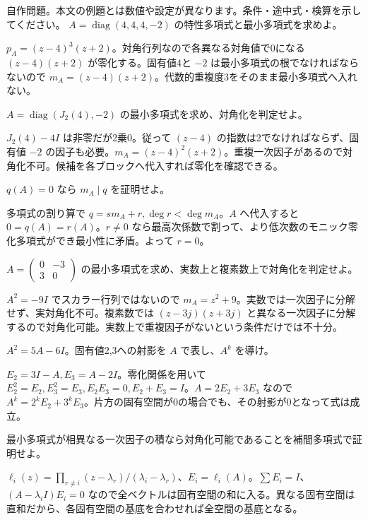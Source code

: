 \documentclass[11pt]{article}
\begin{document}
自作問題。本文の例題とは数値や設定が異なります。条件・途中式・検算を示してください。
\problem[最小と特性の違い]
$A=\operatorname{diag}(4,4,4,-2)$ の特性多項式と最小多項式を求めよ。
\begin{ans}
$p_A=(z-4)^3(z+2)$。対角行列なので各異なる対角値で0になる $(z-4)(z+2)$ が零化する。固有値4と $-2$ は最小多項式の根でなければならないので $m_A=(z-4)(z+2)$。代数的重複度3をそのまま最小多項式へ入れない。
\end{ans}
\problem[非自明なブロック]
$A=\operatorname{diag}(J_2(4),-2)$ の最小多項式を求め、対角化を判定せよ。
\begin{ans}
$J_2(4)-4I$ は非零だが2乗0。従って $(z-4)$ の指数は2でなければならず、固有値 $-2$ の因子も必要。$m_A=(z-4)^2(z+2)$。重複一次因子があるので対角化不可。候補を各ブロックへ代入すれば零化を確認できる。
\end{ans}
\newpage
\problem[整除性の証明]
$q(A)=0$ なら $m_A\mid q$ を証明せよ。
\begin{ans}
多項式の割り算で $q=s m_A+r,\deg r<\deg m_A$。$A$ へ代入すると $0=q(A)=r(A)$。$r\ne0$ なら最高次係数で割って、より低次数のモニック零化多項式ができ最小性に矛盾。よって $r=0$。
\end{ans}
\problem[体の条件]
$A=\begin{pmatrix}0&-3\\3&0\end{pmatrix}$ の最小多項式を求め、実数上と複素数上で対角化を判定せよ。
\begin{ans}
$A^2=-9I$ でスカラー行列ではないので $m_A=z^2+9$。実数では一次因子に分解せず、実対角化不可。複素数では $(z-3j)(z+3j)$ と異なる一次因子に分解するので対角化可能。実数上で重複因子がないという条件だけでは不十分。
\end{ans}
\newpage
\problem[スペクトル射影]
$A^2=5A-6I$。固有値2,3への射影を $A$ で表し、$A^k$ を導け。
\begin{ans}
$E_2=3I-A,E_3=A-2I$。零化関係を用いて $E_2^2=E_2,E_3^2=E_3,E_2E_3=0,E_2+E_3=I$。$A=2E_2+3E_3$ なので $A^k=2^kE_2+3^kE_3$。片方の固有空間が0の場合でも、その射影が0となって式は成立。
\end{ans}
\problem[十分性の証明]
最小多項式が相異なる一次因子の積なら対角化可能であることを補間多項式で証明せよ。
\begin{ans}
$\ell_i(z)=\prod_{r\ne i}(z-\lambda_r)/(\lambda_i-\lambda_r)$、$E_i=\ell_i(A)$。$\sum E_i=I$、$(A-\lambda_iI)E_i=0$ なので全ベクトルは固有空間の和に入る。異なる固有空間は直和だから、各固有空間の基底を合わせれば全空間の基底となる。
\end{ans}
\end{document}
